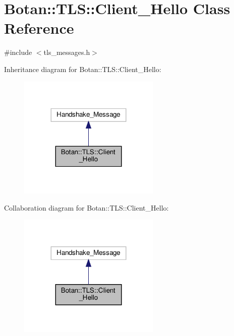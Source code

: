 \hypertarget{class_botan_1_1_t_l_s_1_1_client___hello}{}\section{Botan\+:\+:T\+LS\+:\+:Client\+\_\+\+Hello Class Reference}
\label{class_botan_1_1_t_l_s_1_1_client___hello}


{\ttfamily \#include $<$tls\+\_\+messages.\+h$>$}



Inheritance diagram for Botan\+:\+:T\+LS\+:\+:Client\+\_\+\+Hello\+:
\nopagebreak
\begin{figure}[H]
\begin{center}
\leavevmode
\includegraphics[width=191pt]{class_botan_1_1_t_l_s_1_1_client___hello__inherit__graph}
\end{center}
\end{figure}


Collaboration diagram for Botan\+:\+:T\+LS\+:\+:Client\+\_\+\+Hello\+:
\nopagebreak
\begin{figure}[H]
\begin{center}
\leavevmode
\includegraphics[width=191pt]{class_botan_1_1_t_l_s_1_1_client___hello__coll__graph}
\end{center}
\end{figure}

